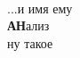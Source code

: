 \begin{center}
  \thispagestyle{empty} \quad \\
  [7cm]
  
  {\tiny ...и имя ему} \hspace{7cm} \quad\\
  
   {\Huge \bf АН}{\tiny ализ}\\
  [15cm]
  
  {\tiny ну такое}
\end{center}
